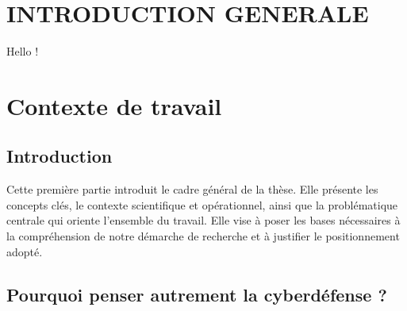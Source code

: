 \documentclass[ twoside,openright,titlepage,numbers=noenddot,headinclude,%
                footinclude=true,cleardoublepage=empty,abstractoff, %
                BCOR=5mm,paper=a4,fontsize=11pt,%
                french,american,%
                ]{scrreprt}
\begin{document}
\frenchspacing
\raggedbottom
{} %
\pagestyle{plain}




\cleardoublepage
\cleardoublepage

\cleardoublepage 
\pagestyle{scrheadings}
\cleardoublepage 

\cleardoublepage{}
\cleardoublepage

\part*{INTRODUCTION GENERALE}
Hello !

\part{Contexte de travail}

\chapter*{Introduction}

Cette première partie introduit le cadre général de la thèse. Elle présente les concepts clés, le contexte scientifique et opérationnel, ainsi que la problématique centrale qui oriente l'ensemble du travail. Elle vise à poser les bases nécessaires à la compréhension de notre démarche de recherche et à justifier le positionnement adopté.

\chapter{Pourquoi penser autrement la cyberdéfense ?}
\end{document}
